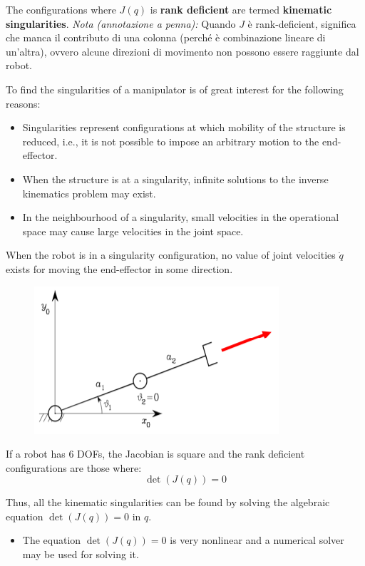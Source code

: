 The configurations where $J(q)$ is \textbf{rank deficient} are termed \textbf{kinematic singularities}.
\textit{Nota (annotazione a penna):} Quando $J$ è rank-deficient, significa che manca il contributo di una colonna (perché è combinazione lineare di un'altra), ovvero alcune direzioni di movimento non possono essere raggiunte dal robot.

To find the singularities of a manipulator is of great interest for the following reasons:
\begin{itemize}
    \item Singularities represent configurations at which mobility of the structure is reduced, i.e., it is not possible to impose an arbitrary motion to the end-effector.
    \item When the structure is at a singularity, infinite solutions to the inverse kinematics problem may exist.
    \item In the neighbourhood of a singularity, small velocities in the operational space may cause large velocities in the joint space.
\end{itemize}

When the robot is in a singularity configuration, no value of joint velocities $\dot{q}$ exists for moving the end-effector in some direction.

\begin{figure}[H]
    \centering
    \includegraphics[width=0.6\linewidth]{imgs/kinematic_sing_1.png}
\end{figure}

If a robot has 6 DOFs, the Jacobian is square and the rank deficient configurations are those where:
\[
\det(J(q)) = 0
\]

Thus, all the kinematic singularities can be found by solving the algebraic equation $\det(J(q)) = 0$ in $q$.

\begin{itemize}
    \item The equation $\det(J(q)) = 0$ is very nonlinear and a numerical solver may be used for solving it.
\end{itemize}


